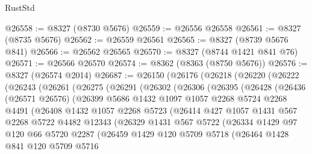 \begin{lexlean}{RustStd}
\begin{coremodule}
@26558 := @8327 (@8730 @5676)
@26559 := @26556 @26558
@26561 := @8327 (@8735 @5676)
@26562 := @26559 @26561
@26565 := @8327 (@8739 @5676 @841)
@26566 := @26562 @26565
@26570 := @8327 (@8744 @1421 @841 @76)
@26571 := @26566 @26570
@26574 := @8362 (@8363 (@8750 @5676))
@26576 := @8327 (@26574 @2014)
@26687 := @26150
    (@26176
      (@26218
        (@26220
          (@26222
            (@26243
              (@26261
                (@26275
                  (@26291
                    (@26302
                      (@26306
                        (@26395
                          (@26428
                            (@26436
                              (@26571 @26576)
                              (@26399
                                @5686
                                @1432
                                @1097
                                @1057
                                @2268
                                @5724
                                @2268
                                @4491
                                (@26408
                                  @1432
                                  @1057
                                  @2268
                                  @5723
                                  (@26414
                                    @427
                                    @1057
                                    @1431
                                    @567
                                    @2268
                                    @5722
                                    @4482
                                    @12343
                                    (@26329
                                      @1431
                                      @567
                                      @5722
                                      (@26334
                                        @1429
                                        @97
                                        @120
                                        @66
                                        @5720
                                        @2287
                                        (@26459
                                          @1429
                                          @120
                                          @5709
                                          @5718
                                          (@26464
                                            @1428
                                            @841
                                            @120
                                            @5709
                                            @5716

\end{coremodule}
\end{lexlean}
